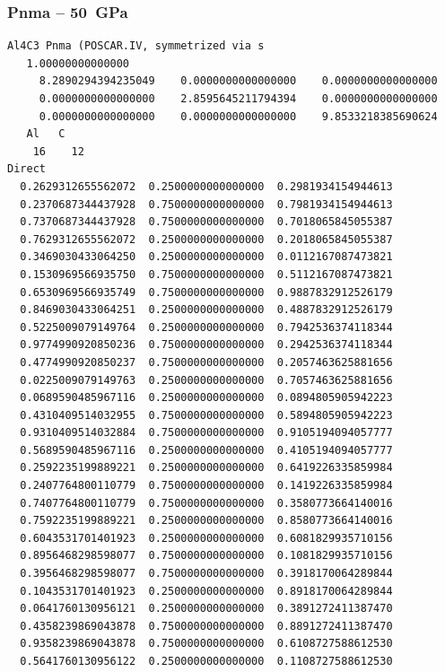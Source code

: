 \subsubsection*{Pnma -- 50~GPa}
\begin{footnotesize}
\begin{verbatim}
Al4C3 Pnma (POSCAR.IV, symmetrized via s
   1.00000000000000     
     8.2890294394235049    0.0000000000000000    0.0000000000000000
     0.0000000000000000    2.8595645211794394    0.0000000000000000
     0.0000000000000000    0.0000000000000000    9.8533218385690624
   Al   C 
    16    12
Direct
  0.2629312655562072  0.2500000000000000  0.2981934154944613
  0.2370687344437928  0.7500000000000000  0.7981934154944613
  0.7370687344437928  0.7500000000000000  0.7018065845055387
  0.7629312655562072  0.2500000000000000  0.2018065845055387
  0.3469030433064250  0.2500000000000000  0.0112167087473821
  0.1530969566935750  0.7500000000000000  0.5112167087473821
  0.6530969566935749  0.7500000000000000  0.9887832912526179
  0.8469030433064251  0.2500000000000000  0.4887832912526179
  0.5225009079149764  0.2500000000000000  0.7942536374118344
  0.9774990920850236  0.7500000000000000  0.2942536374118344
  0.4774990920850237  0.7500000000000000  0.2057463625881656
  0.0225009079149763  0.2500000000000000  0.7057463625881656
  0.0689590485967116  0.2500000000000000  0.0894805905942223
  0.4310409514032955  0.7500000000000000  0.5894805905942223
  0.9310409514032884  0.7500000000000000  0.9105194094057777
  0.5689590485967116  0.2500000000000000  0.4105194094057777
  0.2592235199889221  0.2500000000000000  0.6419226335859984
  0.2407764800110779  0.7500000000000000  0.1419226335859984
  0.7407764800110779  0.7500000000000000  0.3580773664140016
  0.7592235199889221  0.2500000000000000  0.8580773664140016
  0.6043531701401923  0.2500000000000000  0.6081829935710156
  0.8956468298598077  0.7500000000000000  0.1081829935710156
  0.3956468298598077  0.7500000000000000  0.3918170064289844
  0.1043531701401923  0.2500000000000000  0.8918170064289844
  0.0641760130956121  0.2500000000000000  0.3891272411387470
  0.4358239869043878  0.7500000000000000  0.8891272411387470
  0.9358239869043878  0.7500000000000000  0.6108727588612530
  0.5641760130956122  0.2500000000000000  0.1108727588612530
 

\end{verbatim}
\end{footnotesize}
